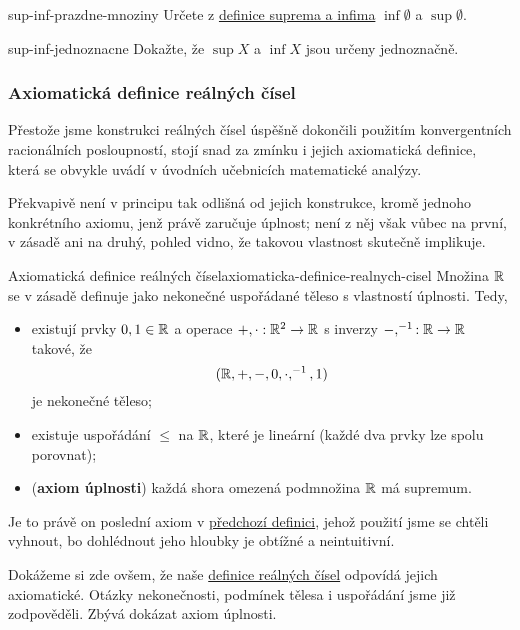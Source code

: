 \begin{exercise}{}{sup-inf-prazdne-mnoziny}
 Určete z \hyperref[def:supremum-a-infimum]{definice suprema a infima} $\inf
 \emptyset$ a $\sup \emptyset$.
\end{exercise}

\begin{exercise}{}{sup-inf-jednoznacne}
 Dokažte, že $\sup X$ a $\inf X$ jsou určeny jednoznačně.
\end{exercise}

\subsubsection{Axiomatická definice reálných čísel}
\label{sssec:axiomaticka-definice-realnych-cisel}

Přestože jsme konstrukci reálných čísel úspěšně dokončili použitím
konvergentních racionálních posloupností, stojí snad za zmínku i jejich
axiomatická definice, která se obvykle uvádí v úvodních učebnicích matematické
analýzy.

Překvapivě není v principu tak odlišná od jejich konstrukce, kromě jednoho
konkrétního axiomu, jenž právě zaručuje úplnost; není z něj však vůbec na první,
v zásadě ani na druhý, pohled vidno, že takovou vlastnost skutečně implikuje.

\begin{definition}{Axiomatická definice reálných
 čísel}{axiomaticka-definice-realnych-cisel}
 Množina $\mathbb{R}$ se v zásadě definuje jako nekonečné uspořádané těleso s vlastností
 úplnosti. Tedy,
 \begin{itemize}
  \item existují prvky $0,1 \in \mathbb{R}$ a operace $+, \cdot :\mathbb{R}^{2} \to \mathbb{R}$ s
   inverzy $-,^{-1}:\mathbb{R} \to \mathbb{R}$ takové, že
   \[
    (\mathbb{R},+,-,0, \cdot ,^{-1},1)
   \]
   je nekonečné těleso;
  \item existuje uspořádání $ \leq $ na $\mathbb{R}$, které je lineární (každé dva prvky
   lze spolu porovnat);
  \item (\textbf{axiom úplnosti}) každá shora omezená podmnožina $\mathbb{R}$ má
   supremum.
 \end{itemize}
\end{definition}

Je to právě on poslední axiom v
\hyperref[def:axiomaticka-definice-realnych-cisel]{předchozí definici}, jehož
použití jsme se chtěli vyhnout, bo dohlédnout jeho hloubky je obtížné a
neintuitivní.

Dokážeme si zde ovšem, že naše \hyperref[def:realna-cisla]{definice reálných
čísel} odpovídá jejich axiomatické. Otázky nekonečnosti, podmínek tělesa i
uspořádání jsme již zodpověděli. Zbývá dokázat axiom úplnosti.

